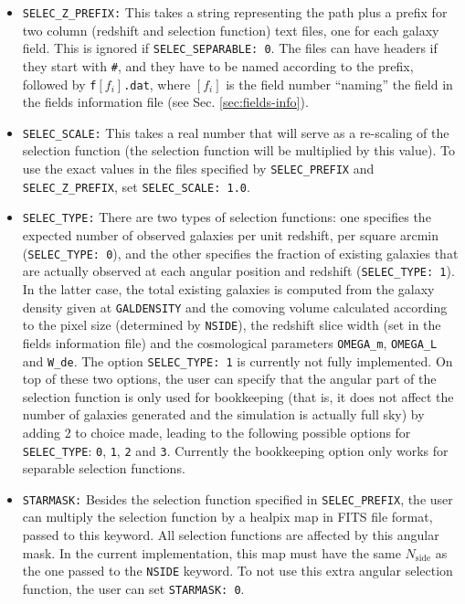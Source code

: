 \documentclass[12pt]{book} %
\newcommand{\nv}[1]{\mathrm{#1}}                 %
\begin{document}
\begin{itemize}
\item {\tt SELEC\_Z\_PREFIX:} This takes a string representing the path plus a prefix for 
  two column (redshift and selection function) text files, one for each galaxy field. 
  This is ignored if {\tt SELEC\_SEPARABLE: 0}. The files can have headers if they start with {\tt \#}, 
  and they have to be named according to the prefix, followed by {\tt f}$[f_i]${\tt .dat}, where 
  $[f_i]$ is the field number ``naming'' the field in the fields information file (see Sec. 
  \ref{sec:fields-info}).

 \item {\tt SELEC\_SCALE:} This takes a real number that will serve as a re-scaling of the selection 
   function (the selection function will be multiplied by this value). To use the exact values in the 
   files specified by {\tt SELEC\_PREFIX} and {\tt SELEC\_Z\_PREFIX}, set {\tt SELEC\_SCALE: 1.0}.

\item {\tt SELEC\_TYPE:} There are two types of selection functions: one specifies the expected 
  number of observed galaxies per unit redshift, per square arcmin ({\tt SELEC\_TYPE: 0}), and 
  the other specifies the fraction of existing galaxies that are actually observed at each angular 
  position and redshift ({\tt SELEC\_TYPE: 1}). In the latter case, the total existing galaxies 
  is computed from the galaxy density given at {\tt GALDENSITY} and the comoving volume calculated 
  according to the pixel size (determined by {\tt NSIDE}), the redshift slice width (set in the 
  fields information file) and the cosmological parameters {\tt OMEGA\_m}, {\tt OMEGA\_L} and 
  {\tt W\_de}. The option {\tt SELEC\_TYPE: 1} is currently not fully implemented. On top of these 
  two options, the user can specify that the angular part of the selection function is only 
  used for bookkeeping (that is, it does not affect the number of galaxies generated and the 
  simulation is actually full sky) by adding 2 to choice made, leading to the following possible 
  options for {\tt SELEC\_TYPE}: {\tt 0}, {\tt 1}, {\tt 2} and {\tt 3}. Currently the bookkeeping 
  option only works for separable selection functions. 

\item {\tt STARMASK:} Besides the selection function specified in {\tt SELEC\_PREFIX}, the user 
  can multiply the selection function by a {\sc healpix} map in FITS file format, passed to this 
  keyword. All selection functions are affected by this angular mask. In the current implementation, 
  this map must have the same $N_{\nv{side}}$ as the one passed to the {\tt NSIDE} keyword.
  To not use this extra angular selection function, the user can set {\tt STARMASK: 0}.


\end{itemize}
\end{document}
